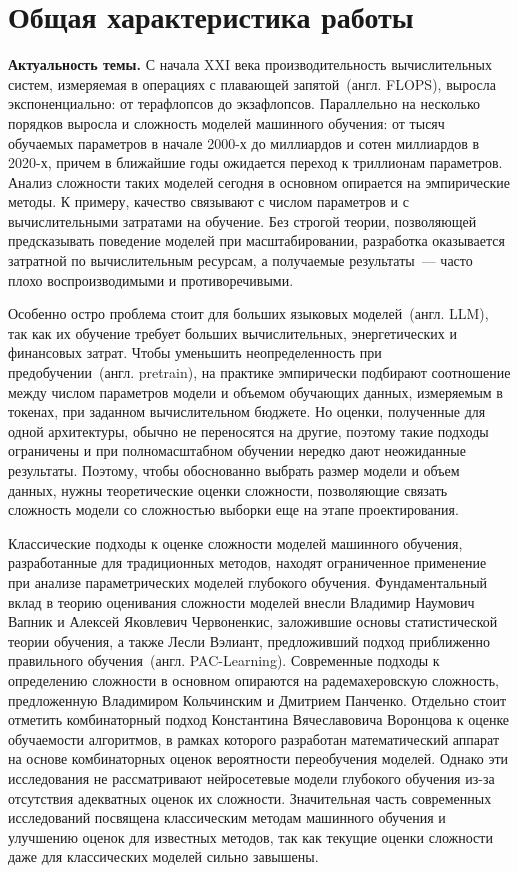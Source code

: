 \documentclass{dissert}
\newcommand{\paragraph}[1]{\noindent\textbf{#1}\quad}
\begin{document}
\clearpage


\section*{Общая характеристика работы}
\paragraph{Актуальность темы.}
С начала XXI века производительность вычислительных систем, измеряемая в операциях с плавающей запятой~(англ. FLOPS), выросла экспоненциально: от терафлопсов до экзафлопсов.
Параллельно на несколько порядков выросла и сложность моделей машинного обучения: от тысяч обучаемых параметров в начале 2000-х до миллиардов и сотен миллиардов в 2020-х, причем в ближайшие годы ожидается переход к триллионам параметров.
Анализ сложности таких моделей сегодня в основном опирается на эмпирические методы. К примеру, качество связывают с числом параметров и с вычислительными затратами на обучение.
Без строгой теории, позволяющей предсказывать поведение моделей при масштабировании, разработка оказывается затратной по вычислительным ресурсам, а получаемые результаты~--- часто плохо воспроизводимыми и противоречивыми.

Особенно остро проблема стоит для больших языковых моделей~(англ. LLM), так как их обучение требует больших вычислительных, энергетических и финансовых затрат.
Чтобы уменьшить неопределенность при предобучении~(англ. pretrain), на практике эмпирически подбирают соотношение между числом параметров модели и объемом обучающих данных, измеряемым в токенах, при заданном вычислительном бюджете.
Но оценки, полученные для одной архитектуры, обычно не переносятся на другие, поэтому такие подходы ограничены и при полномасштабном обучении нередко дают неожиданные результаты.
Поэтому, чтобы обоснованно выбрать размер модели и объем данных, нужны теоретические оценки сложности, позволяющие связать сложность модели со сложностью выборки еще на этапе проектирования.

Классические подходы к оценке сложности моделей машинного обучения, разработанные для традиционных методов, находят ограниченное применение при анализе параметрических моделей глубокого обучения.
Фундаментальный вклад в теорию оценивания сложности моделей внесли Владимир Наумович Вапник и Алексей Яковлевич Червоненкис, заложившие основы статистической теории обучения, а также Лесли Вэлиант, предложивший подход приближенно правильного обучения~(англ. PAC-Learning).
Современные подходы к определению сложности в основном опираются на радемахеровскую сложность, предложенную Владимиром Кольчинским и Дмитрием Панченко.
Отдельно стоит отметить комбинаторный подход Константина Вячеславовича Воронцова к оценке обучаемости алгоритмов, в рамках которого разработан математический аппарат на основе комбинаторных оценок вероятности переобучения моделей.
Однако эти исследования не рассматривают нейросетевые модели глубокого обучения из-за отсутствия адекватных оценок их сложности.
Значительная часть современных исследований посвящена классическим методам машинного обучения и улучшению оценок для известных методов, так как текущие оценки сложности даже для классических моделей сильно завышены.
\end{document}
